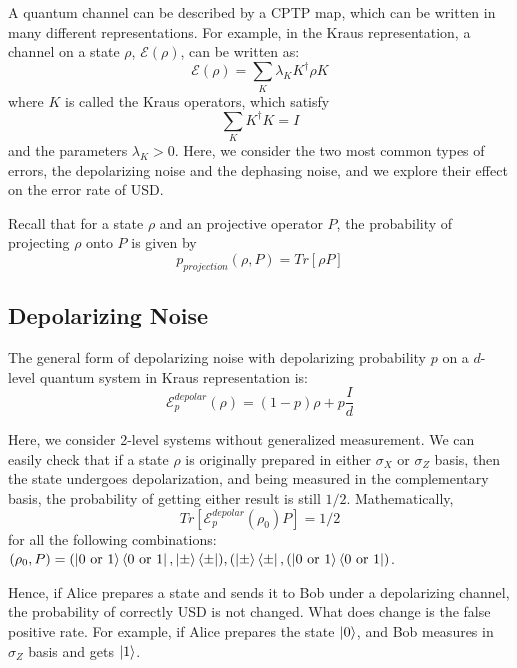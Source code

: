 \documentclass[%
 reprint,
superscriptaddress,
 amsmath,amssymb,
 aps,
]{revtex4-2}
\begin{document}
A quantum channel can be described by a CPTP map, which can be written in many different representations. For example, in the Kraus representation, a channel on a state $\rho$, $\mathcal{E}(\rho)$, can be written as:
\begin{equation}
    \mathcal{E}(\rho)=\sum_K \lambda_K K^\dagger\rho K
\end{equation}
where $K$ is called the Kraus operators, which satisfy 
\begin{equation}
    \sum_KK^\dagger K=I
\end{equation}
and the parameters $\lambda_K>0$.
Here, we consider the two most common types of errors, the depolarizing noise and the dephasing noise, and we explore their effect on the error rate of USD.

Recall that for a state $\rho$ and an projective operator $P$, the probability of projecting $\rho$ onto $P$ is given by
\begin{equation}
    p_{projection}(\rho, P)=Tr[\rho P]
\end{equation}

\subsection{Depolarizing Noise}
The general form of depolarizing noise with depolarizing probability $p$ on a $d$-level quantum system in Kraus representation is:
\begin{equation}
    \mathcal{E}^{depolar}_{p}(\rho)=(1-p)\rho+p\frac{I}{d}
\end{equation}

Here, we consider 2-level systems without generalized measurement. We can easily check that if a state $\rho$ is originally prepared in either $\sigma_X$ or $\sigma_Z$ basis, then the state undergoes depolarization, and being measured in the complementary basis, the probability of getting either result is still $1/2$. Mathematically, 
\begin{equation}
    Tr[\mathcal{E}^{depolar}_p(\rho_0)P]=1/2
\end{equation}
for all the following combinations: $(\rho_0, P)=(\ket{0\text{ or }1}\bra{0\text{ or }1}, \ket{\pm}\bra{\pm}), (\ket{\pm}\bra{\pm}, (\ket{0\text{ or }1}\bra{0\text{ or }1})$.

Hence, if Alice prepares a state and sends it to Bob under a depolarizing channel, the probability of correctly USD is not changed. What does change is the false positive rate. For example, if Alice prepares the state $\ket{0}$, and Bob measures in $\sigma_Z$ basis and gets $\ket{1}$.
\end{document}
